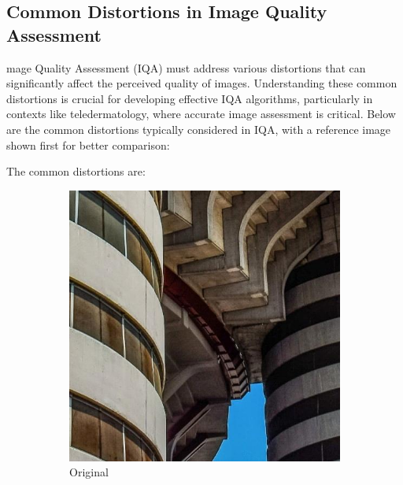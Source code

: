\subsection{Common Distortions in Image Quality Assessment}
\label{sub:CommonDistortionsIQA}
mage Quality Assessment (IQA) must address various distortions that can significantly affect the perceived quality of images. Understanding these common distortions is crucial for developing effective IQA algorithms, particularly in contexts like teledermatology, where accurate image assessment is critical. Below are the common distortions typically considered in IQA, with a reference image shown first for better comparison: \par
The common distortions are:
\begin{figure}[ht]
    \centering
    \begin{subfigure}[b]{0.24\textwidth}
        \includegraphics[width=\textwidth]{img/Original.jpg}
        \caption{Original}
    \end{subfigure}
    \hfill
    \begin{subfigure}[b]{0.24\textwidth}

\end{subfigure}
\end{figure}
